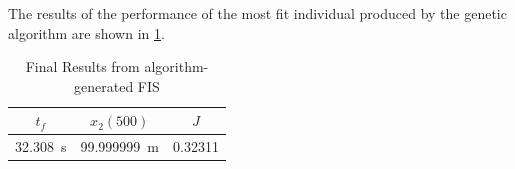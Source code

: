 The results of the performance of the most fit individual produced by the genetic algorithm are shown in
\cref{tab:garesult}.

\begin{table} \centering \caption{Final Results from algorithm-generated FIS}\label{tab:garesult}
\begin{tabular}{|c|c|c|} \hline $t_f$ & $x_2(500)$ & $J$ \\\hline \SI{32.308}{\second} &
\SI{99.999999}{\metre} &  0.32311 \\\hline \end{tabular} \end{table}

\begin{figure} \begin{subfigmatrix}{2}   \end{subfigmatrix} \end{figure}

